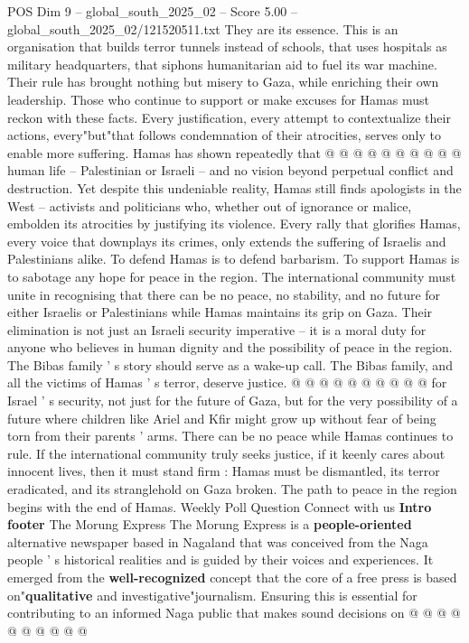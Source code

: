 \begin{textsample}{POS Dim 9 – global\_south\_2025\_02 – Score 5.00 – global\_south\_2025\_02/121520511.txt}
They are its essence.
This is an organisation that builds terror tunnels instead of schools, that uses hospitals as military headquarters, that siphons humanitarian aid to fuel its war machine.
Their rule has brought nothing but misery to Gaza, while enriching their own leadership.
Those who continue to support or make excuses for Hamas must reckon with these facts.
Every justification, every attempt to contextualize their actions, every"but"that follows condemnation of their atrocities, serves only to enable more suffering.
Hamas has shown repeatedly that @ @ @ @ @ @ @ @ @ @ human life -- Palestinian or Israeli -- and no vision beyond perpetual conflict and destruction.
Yet despite this undeniable reality, Hamas still finds apologists in the West -- activists and politicians who, whether out of ignorance or malice, embolden its atrocities by justifying its violence.
Every rally that glorifies Hamas, every voice that downplays its crimes, only extends the suffering of Israelis and Palestinians alike.
To defend Hamas is to defend barbarism.
To support Hamas is to sabotage any hope for peace in the region.
The international community must unite in recognising that there can be no peace, no stability, and no future for either Israelis or Palestinians while Hamas maintains its grip on Gaza.
Their elimination is not just an Israeli security imperative -- it is a moral duty for anyone who believes in human dignity and the possibility of peace in the region.
The Bibas family ' s story should serve as a wake-up call.
The Bibas family, and all the victims of Hamas ' s terror, deserve justice. @ @ @ @ @ @ @ @ @ @ for Israel ' s security, not just for the future of Gaza, but for the very possibility of a future where children like Ariel and Kfir might grow up without fear of being torn from their parents ' arms.
There can be no peace while Hamas continues to rule.
If the international community truly seeks justice, if it keenly cares about innocent lives, then it must stand firm : Hamas must be dismantled, its terror eradicated, and its stranglehold on Gaza broken.
The path to peace in the region begins with the end of Hamas.
Weekly Poll Question Connect with us \textbf{Intro} \textbf{footer} The Morung Express The Morung Express is a \textbf{people-oriented} alternative newspaper based in Nagaland that was conceived from the Naga people ' s historical realities and is guided by their voices and experiences.
It emerged from the \textbf{well-recognized} concept that the core of a free press is based on"\textbf{qualitative} and investigative"journalism.
Ensuring this is essential for contributing to an informed Naga public that makes sound decisions on @ @ @ @ @ @ @ @ @ @

\end{textsample}
